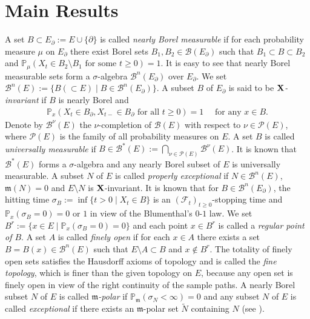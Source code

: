 \documentclass[12pt,a4paper]{article}
\newcommand{\m}{\mathfrak{m} }
\newcommand{\1}{{\bf 1}}
\begin{document}
\section{
Main Results}\label{sec:subharmonicity}
A set $B\subset E_{\partial}:=E\cup\{\partial\}$ is called {\it nearly Borel measurable} if for each probability measure $\mu$ on $E_{\partial}$ there exist Borel sets $B_1,B_2\in\mathscr{B}(E_{\partial})$ such that 
$B_1\subset B\subset B_2$ and $\mathbb{P}_{\mu}(X_t\in B_2\setminus B_1\text{ for some }t\geq0)=1$. It is easy to see that nearly Borel measurable sets form a $\sigma$-algebra $\mathscr{B}^n(E_{\partial})$ over $E_{\partial}$. We set   
$\mathscr{B}^n(E):=\{B(\subset E)\mid B\in \mathscr{B}^n(E_{\partial})\}$.
A subset $B$ of $E_{\partial}$ is said to be {\it ${\bf X}$-invariant} 
if $B$ is nearly Borel and
\begin{align*}
\mathbb{P}_x(X_t\in B_{\partial},X_{t-}\in B_{\partial}\text{ for all }t\geq0)=1\quad\text{ for any }x\in B.
\end{align*}
Denote by $\mathscr{B}^{\nu}(E)$ the $\nu$-completion of $\mathscr{B}(E)$ with respect to $\nu\in\mathscr{P}(E)$, where $\mathscr{P}(E)$ is the family of all probability measures on $E$. A set $B$ 
is called {\it universally measurable} if $B\in\mathscr{B}^*(E):=\bigcap_{\nu\in\mathscr{P}(E)}\mathscr{B}^{\nu}(E)$. 
It is known that $\mathscr{B}^*(E)$ forms a $\sigma$-algebra and any nearly Borel subset of $E$ is universally measurable.  
A subset $N$ of $E$ is called {\it properly exceptional} if 
$N\in\mathscr{B}^n(E)$, ${\m}(N)=0$ and $E\setminus N$ is ${\bf X}$-invariant.  
It is known that for $B\in\mathscr{B}^n(E_{\partial})$, the hitting time $\sigma_B:=\inf\{t>0\mid X_t\in B\}$ is an $(\mathscr{F}_t)_{t\geq0}$-stopping time and $\mathbb{P}_x(\sigma_B=0)=0$ or $1$ in view of the Blumenthal's $0$-$1$ law. We set $B^r:=\{x\in E\mid \mathbb{P}_x(\sigma_B=0)=0\}$ and each point $x\in B^r$ is called a {\it regular point of $B$}. 
A set $A$ is called {\it finely open} if for each $x\in A$ there exists a set 
$B=B(x)\in\mathscr{B}^n(E)$ such that $E\setminus A\subset B$ and 
$x\notin B^r$.
The totality of finely open sets satisfies the Hausdorff axioms of topology and is called the {\it fine topology}, which is finer than the given topology on $E$, because any open set is finely open in view of the right continuity of the sample paths. 
A nearly Borel subset $N$ of $E$ is called {\it ${\m}$-polar} if $\mathbb{P}_{\m}(\sigma_N<\infty)=0$ and any subset $N$ of $E$ is called {\it exceptional} if there exists an ${\m}$-polar set $\tilde{N}$ containing $N$ (see \cite[Chapter IV, Definition~5.17]{MR}). 
\end{document}
